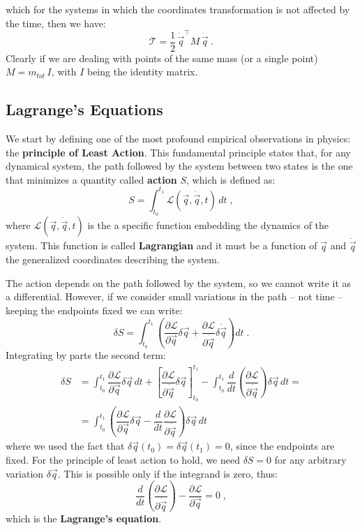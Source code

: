 \documentclass[12pt,a4paper]{article}
\begin{document}
which for the systems in which the coordinates transformation is not affected
by the time, then we have:
\begin{equation}
	\mathcal{T} = \frac{1}{2} \, \dot{\vec{q}}^\top M \, \dot{\vec{q}}\;.
\end{equation}
Clearly if we are dealing with points of the same mass (or a single point)
$M=m_{tot}\,I$, with $I$ being the identity matrix.

\subsection{Lagrange's Equations}
We start by defining one of the most profound empirical observations in physics: the
\textbf{principle of Least Action}. This fundamental principle states that, for any dynamical
system, the path followed by the system between two states is the one that minimizes a quantity
called \textbf{action} $S$, which is defined as:
\begin{equation}
	S = \int_{t_0}^{t_1} \mathcal{L}(\vec{q},\dot{\vec{q}},t) \, dt \;,
\end{equation}
where $\mathcal{L}(\vec{q},\dot{\vec{q}},t)$ is the a specific function embedding
the dynamics of the system. This function is called \textbf{Lagrangian} and it must be a
function of $\vec{q}$ and $\dot{\vec{q}}$ the generalized coordinates describing the system.

The action depends on the path followed by the system, so we cannot write it as a differential.
However, if we consider small variations in the path -- not time -- keeping the endpoints fixed
we can write:
\begin{equation}
	\delta S = \int_{t_0}^{t_1} \left( \dfrac{\partial \mathcal{L}}{\partial \vec{q}} \delta \vec{q} + \dfrac{\partial \mathcal{L}}{\partial \dot{\vec{q}}} \delta \dot{\vec{q}} \right) dt \;.
\end{equation}
Integrating by parts the second term:
\begin{align*}
	\delta S &= \int_{t_0}^{t_1} \dfrac{\partial \mathcal{L}}{\partial \vec{q}} \delta \vec{q} \, dt + \left[ \dfrac{\partial \mathcal{L}}{\partial \dot{\vec{q}}} \delta \vec{q} \right]_{t_0}^{t_1} - \int_{t_0}^{t_1} \dfrac{d}{dt}\left( \dfrac{\partial \mathcal{L}}{\partial \dot{\vec{q}}} \right) \delta \vec{q} \, dt =\\[5pt]
	&= \int_{t_0}^{t_1} \left( \dfrac{\partial \mathcal{L}}{\partial \vec{q}} \delta \vec{q} - \dfrac{d}{dt} \dfrac{\partial \mathcal{L}}{\partial \dot{\vec{q}}} \right) \delta \vec{q} \, dt
\end{align*}
where we used the fact that $\delta \vec{q}(t_0) = \delta \vec{q}(t_1) = 0$, since the endpoints
are fixed.
For the principle of least action to hold, we need $\delta S = 0$ for any arbitrary
variation $\delta \vec{q}$. This is possible only if the integrand is zero, thus:
\begin{equation}
	\dfrac{d}{dt} \left( \dfrac{\partial \mathcal{L}}{\partial \dot{\vec{q}}} \right) - \dfrac{\partial \mathcal{L}}{\partial \vec{q}} = 0 \;,
\end{equation}
which is the \textbf{Lagrange's equation}.
\end{document}
